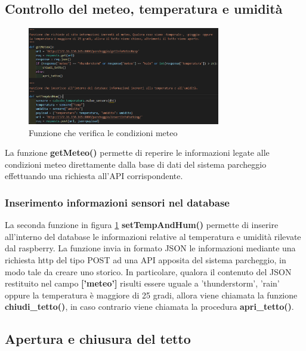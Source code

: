 \documentclass[a4paper,11pt]{report}
\begin{document}
\subsection{Controllo del meteo, temperatura e umidità}
\begin{figure}[H]
	\centering
	\includegraphics[width=0.75\textwidth]{figure/meteo_1.jpg}
	\caption{Funzione che verifica le condizioni meteo}
	\label{meteo_1}
\end{figure}

La funzione \textbf{getMeteo()} permette di reperire le informazioni legate alle condizioni meteo direttamente dalla base di dati del sistema parcheggio effettuando una richiesta all'API corrispondente.
\subsubsection{Inserimento informazioni sensori nel database}
La seconda funzione in figura \ref{meteo_1} \textbf{setTempAndHum()} permette di inserire all’interno del database le informazioni relative al temperatura e umidità rilevate dal raspberry. La funzione invia in formato JSON le informazioni mediante una richiesta http del tipo POST ad una API apposita del sistema parcheggio, in modo tale da creare uno storico.
In particolare, qualora il contenuto del JSON restituito nel campo \textbf{['meteo']} risulti essere uguale a 'thunderstorm', 'rain' oppure la temperatura è maggiore di 25 gradi, allora viene chiamata la funzione \textbf{chiudi\_tetto()}, in caso contrario viene chiamata la procedura \textbf{apri\_tetto()}.

\subsection{Apertura e chiusura del tetto}
\end{document}
